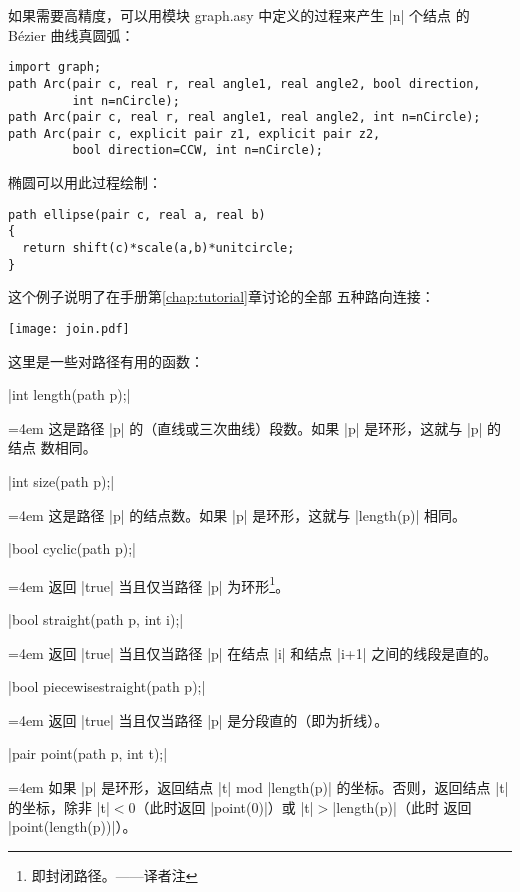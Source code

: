 \documentclass{ctexbook}
\makeatletter
\newenvironment{funclist}{\trivlist
  \parindent=0pt
\item[]
  \def\item{\medskip\par\leftskip=0pt}
  \def\go{\par\leftskip=4em}}
{\endtrivlist}
\newenvironment{typelist}{\itemize
  \let\old@item\@item
  \def\@item[##1]{\expandafter\old@item[\ttfamily\color{type!50!black}##1]}}
{\enditemize}
\newcommand*\prgname[1]{\textsf{#1}}
\newcommand\transnote[1]{\footnote{#1——译者注}}
\makeatother
\begin{document}
\begin{typelist}
如果需要高精度，可以用模块 \prgname{graph.asy} 中定义的过程来产生 |n| 个结点
的 Bézier 曲线真圆弧：
\begin{lstlisting}
import graph;
path Arc(pair c, real r, real angle1, real angle2, bool direction,
         int n=nCircle);
path Arc(pair c, real r, real angle1, real angle2, int n=nCircle);
path Arc(pair c, explicit pair z1, explicit pair z2,
         bool direction=CCW, int n=nCircle);
\end{lstlisting}

椭圆可以用此过程绘制：
\begin{lstlisting}
path ellipse(pair c, real a, real b)
{
  return shift(c)*scale(a,b)*unitcircle;
}
\end{lstlisting}

这个例子说明了在手册第\ref{chap:tutorial}章讨论的全部
五种路向连接：

\begin{center}
  \texttt{[image: join.pdf]}
\end{center}

这里是一些对路径有用的函数：
\begin{funclist}
\item |int length(path p);| \go
  这是路径 |p| 的（直线或三次曲线）段数。如果 |p| 是环形，这就与 |p| 的结点
  数相同。

\item |int size(path p);| \go
  这是路径 |p| 的结点数。如果 |p| 是环形，这就与 |length(p)| 相同。

\item |bool cyclic(path p);| \go
  返回 |true| 当且仅当路径 |p| 为环形\transnote{即封闭路径。}。

\item |bool straight(path p, int i);| \go
  返回 |true| 当且仅当路径 |p| 在结点 |i| 和结点 |i+1| 之间的线段是直的。

\item |bool piecewisestraight(path p);| \go
  返回 |true| 当且仅当路径 |p| 是分段直的（即为折线）。

\item |pair point(path p, int t);| \go
  如果 |p| 是环形，返回结点 |t| mod |length(p)| 的坐标。否则，返回结点 |t|
  的坐标，除非 |t|${}<0$（此时返回 |point(0)|）或 |t|${}>{}$|length(p)|（此时
  返回 |point(length(p))|）。


\end{funclist}
\end{typelist}
\end{document}
